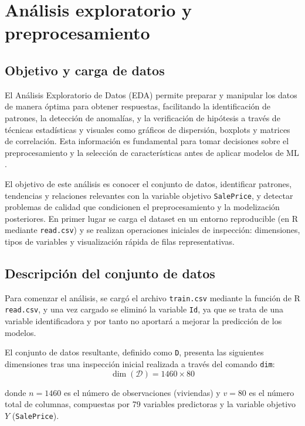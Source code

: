 \documentclass[a4paper,twocolumn]{article}
\begin{document}
	\section{Análisis exploratorio y preprocesamiento}
	\label{sec:eda}

	\subsection{Objetivo y carga de datos}
		El Análisis Exploratorio de Datos (EDA) permite preparar y manipular los datos de manera óptima para obtener
		respuestas, facilitando la identificación de patrones, la detección de anomalías, y la verificación de hipótesis a
		través de técnicas estadísticas y visuales como gráficos de dispersión, boxplots y matrices de correlación. Esta
		información es fundamental para tomar decisiones sobre el preprocesamiento y la selección de características antes
		de aplicar modelos de ML \cite{eda}.

		\vspace{0.2cm}
 
		El objetivo de este análisis es conocer el conjunto de datos, identificar patrones, tendencias y relaciones relevantes con la variable objetivo \texttt{SalePrice}, y detectar problemas de calidad que condicionen el preprocesamiento y la modelización posteriores. En primer lugar se carga el dataset en un entorno reproducible (en R mediante \texttt{read.csv}) y se realizan operaciones iniciales de inspección: dimensiones, tipos de variables y visualización rápida de filas representativas.

		\subsection{Descripción del conjunto de datos}

		Para comenzar el análisis, se cargó el archivo \texttt{train.csv} mediante la función de R \texttt{read.csv}, y una vez cargado se eliminó la variable \texttt{Id},
		ya que se trata de una variable identificadora y por tanto no aportará a mejorar la predicción de los modelos. 
		
		\vspace{0.2cm}

		El conjunto de datos resultante, definido como \texttt{D}, presenta las siguientes dimensiones tras una inspección inicial realizada a través del comando \texttt{dim}:
		\[
		\mathrm{\dim}(\mathcal{D}) = 1460 \times 80
		\]

		donde $n=1460$ es el número de observaciones (viviendas) y $v=80$ es el número total de columnas, compuestas por 79 variables predictoras y la variable objetivo $Y$ (\texttt{SalePrice}).
		
\end{document}
